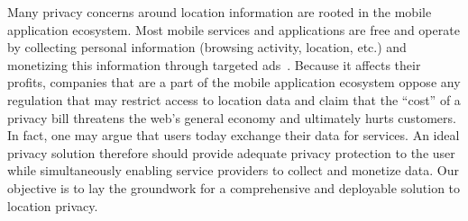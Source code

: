 
Many privacy concerns around location information are rooted in the mobile application ecosystem.
Most mobile services and applications are free and operate by collecting 
personal information (browsing activity, location, etc.) and monetizing this information 
through targeted ads~\cite{Leontiadis:2012}. 
Because it affects their profits, companies that are a part of the mobile application ecosystem oppose any regulation that may restrict access to location data and claim that the ``cost'' of a privacy bill threatens the web's general economy and ultimately hurts customers. 
In fact, one may argue that users today exchange their data for services.
An ideal privacy solution therefore should provide adequate privacy protection to the user while simultaneously
enabling service providers to collect and monetize data. 
Our objective is to lay the groundwork for a comprehensive and deployable solution to location privacy. 


